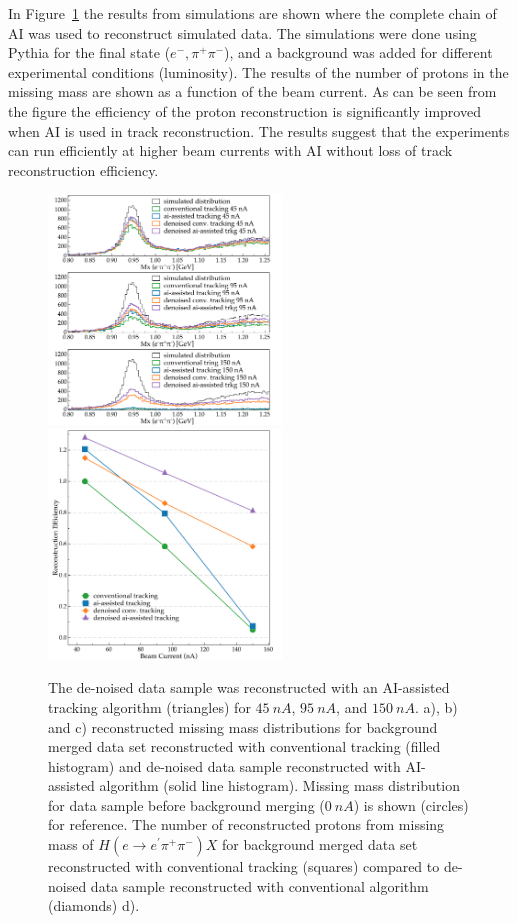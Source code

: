 \documentclass{webofc}
\begin{document}
In Figure~\ref{physics::conv_dn_ai} the results from simulations are shown where the complete chain of AI was used 
to reconstruct simulated data. The simulations were done using Pythia for the final state ($e^-,\pi^+\pi^-$), and a background 
was added for different experimental conditions (luminosity). The results of the number of protons in the missing mass are shown
as a function of the beam current. As can be seen from the figure the efficiency of the proton reconstruction is significantly improved
when AI is used in track reconstruction. The results suggest that the experiments can run efficiently at higher beam currents with
AI without loss of track reconstruction efficiency.

\begin{figure}[!h]
\begin{center}
 \includegraphics[height=2.4in]{images/missing_mass.pdf}
 \includegraphics[height=2.4in]{images/luminosity_scan.pdf}
\caption { 
The de-noised data sample was reconstructed with an AI-assisted tracking 
algorithm (triangles)  for $45~nA$, $95~nA$, and $150~nA$. a), b) and c) reconstructed missing mass distributions for 
background merged data set reconstructed with conventional tracking (filled histogram) and de-noised data sample 
reconstructed with AI-assisted algorithm (solid line histogram). Missing mass distribution for data sample before 
background merging ($0~nA$) is shown (circles) for reference.
The number of reconstructed protons from missing mass of $H(e \rightarrow e^\prime \pi^+ \pi^-) X$ 
for background merged data set reconstructed with conventional tracking (squares) compared to de-noised data sample 
reconstructed with conventional algorithm (diamonds) d). }
 \label{physics::conv_dn_ai}
 \end{center}
\end{figure}
\end{document}
